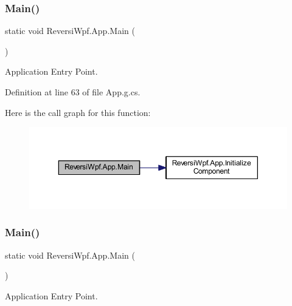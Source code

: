 \subsubsection{\texorpdfstring{Main()}{Main()}\hspace{0.1cm}{\footnotesize\ttfamily [1/4]}}
{\footnotesize\ttfamily static void Reversi\+Wpf.\+App.\+Main (\begin{DoxyParamCaption}{ }\end{DoxyParamCaption})\hspace{0.3cm}{\ttfamily [static]}}



Application Entry Point. 



Definition at line 63 of file App.\+g.\+cs.

Here is the call graph for this function\+:
\nopagebreak
\begin{figure}[H]
\begin{center}
\leavevmode
\includegraphics[width=350pt]{class_reversi_wpf_1_1_app_a21f38c0f40a47a04302edeeb7bf005f8_cgraph}
\end{center}
\end{figure}
\mbox{\label{class_reversi_wpf_1_1_app_a21f38c0f40a47a04302edeeb7bf005f8}} 
\subsubsection{\texorpdfstring{Main()}{Main()}\hspace{0.1cm}{\footnotesize\ttfamily [2/4]}}
{\footnotesize\ttfamily static void Reversi\+Wpf.\+App.\+Main (\begin{DoxyParamCaption}{ }\end{DoxyParamCaption})\hspace{0.3cm}{\ttfamily [static]}}



Application Entry Point. 



